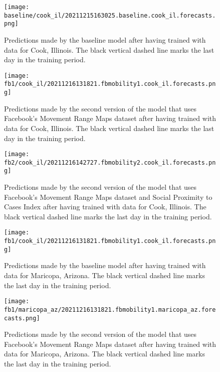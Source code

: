 
\begin{figure}[!htb]
    \centering
    \texttt{[image: baseline/cook\_il/20211215163025.baseline.cook\_il.forecasts.png]}
    \caption{Predictions made by the baseline model after having trained with data for Cook, Illinois. The black vertical dashed line marks the last day in the training period.}
    \label{fig:predictions-cook-baseline}
\end{figure}

\begin{figure}[!htb]
    \centering
    \texttt{[image: fb1/cook\_il/20211216131821.fbmobility1.cook\_il.forecasts.png]}
    \caption{Predictions made by the second version of the model that uses Facebook's Movement Range Maps dataset after having trained with data for Cook, Illinois. The black vertical dashed line marks the last day in the training period.}
    \label{fig:predictions-cook-fb1}
\end{figure}

\begin{figure}[!htb]
    \centering
    \texttt{[image: fb2/cook\_il/20211216142727.fbmobility2.cook\_il.forecasts.png]}
    \caption{Predictions made by the second version of the model that uses Facebook's Movement Range Maps dataset and Social Proximity to Cases Index after having trained with data for Cook, Illinois. The black vertical dashed line marks the last day in the training period.}
    \label{fig:predictions-cook-fb2}
\end{figure}


\begin{figure}[!htb]
    \centering
    \texttt{[image: fb1/cook\_il/20211216131821.fbmobility1.cook\_il.forecasts.png]}
    \caption{Predictions made by the baseline model after having trained with data for Maricopa, Arizona. The black vertical dashed line marks the last day in the training period.}
    \label{fig:predictions-maricopa-baseline}
\end{figure}

\begin{figure}[!htb]
    \centering
    \texttt{[image: fb1/maricopa\_az/20211216131821.fbmobility1.maricopa\_az.forecasts.png]}
    \caption{Predictions made by the second version of the model that uses Facebook's Movement Range Maps dataset after having trained with data for Maricopa, Arizona. The black vertical dashed line marks the last day in the training period.}
    \label{fig:predictions-maricopa-fb1}
\end{figure}

